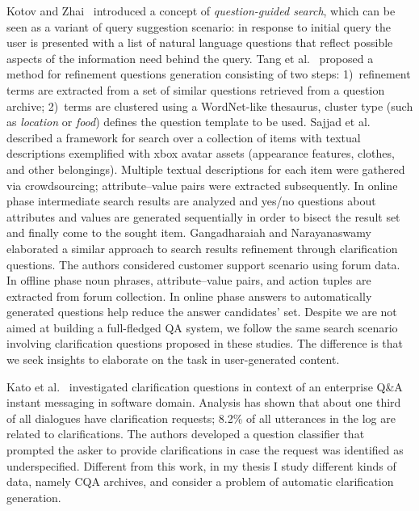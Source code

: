 Kotov and Zhai~\cite{kotov2010} introduced a concept of \textit{question-guided search}, which can be seen as a variant of query suggestion scenario: in response to initial query the user is presented with a list of natural language questions that reflect possible aspects of the information need behind the query.
Tang et al.~\cite{tang2011} proposed a method for refinement questions generation consisting of two steps: 1)~refinement terms are extracted from a set of similar questions retrieved from a question archive; 2)~terms are  clustered using a WordNet-like thesaurus, cluster type (such as \textit{location} or \textit{food}) defines the question template to be used.
Sajjad et al.~\cite{sajjad12} described a framework for search over a collection of items with textual descriptions exemplified with xbox avatar assets (appearance features, clothes, and other belongings).
Multiple textual descriptions for each item were gathered via crowdsourcing; attribute--value pairs were extracted subsequently.
In online phase intermediate search results are analyzed and yes/no questions about attributes and values are generated sequentially in order to bisect the result set and finally come to the sought item.
Gangadharaiah and Narayanaswamy~\cite{gangadharaiah2013} elaborated a similar approach to search results refinement through clarification questions.
The authors considered customer support scenario using forum data.
In offline phase noun phrases, attribute--value pairs, and action tuples are extracted from forum collection.
In online phase answers to automatically generated questions help reduce the answer candidates' set.
Despite we are not aimed at building a full-fledged QA system, we follow the same search scenario involving clarification questions proposed in these studies.
The difference is that we seek insights to elaborate on the task in user-generated content.

Kato et al.~\cite{kato2013} investigated clarification questions in context of an enterprise  Q\&A instant messaging in software domain.
Analysis has shown that about one third of all dialogues have clarification requests; 8.2\% of all utterances in the log are related to clarifications. 
The authors developed a question classifier that prompted the asker to provide clarifications in case the request was identified as underspecified. 
Different from this work, in my thesis I study different kinds of data, namely CQA archives, and consider a problem of automatic clarification generation.

